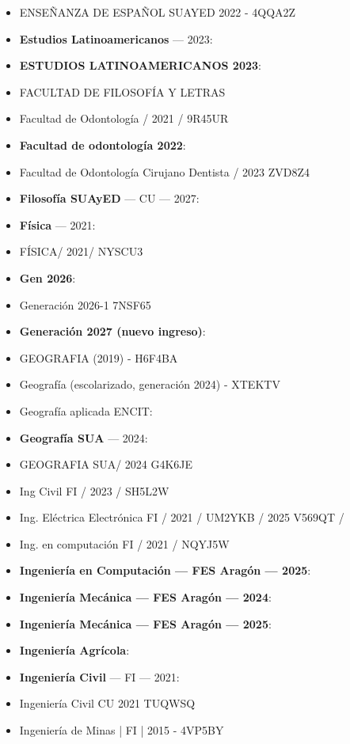 \begin{itemize}[leftmargin=*]
  \item ENSEÑANZA DE ESPAÑOL SUAYED 2022 - 4QQA2Z
  \item \textbf{Estudios Latinoamericanos} --- 2023: 
  \item \textbf{ESTUDIOS LATINOAMERICANOS 2023}: 
  \item FACULTAD DE FILOSOFÍA Y LETRAS
  \item Facultad de Odontología / 2021 / 9R45UR
  \item \textbf{Facultad de odontología 2022}: 
  \item Facultad de Odontología Cirujano Dentista / 2023 ZVD8Z4
  \item \textbf{Filosofía SUAyED} --- CU --- 2027: 
  \item \textbf{Física} --- 2021: 
  \item FÍSICA/ 2021/ NYSCU3
  \item \textbf{Gen 2026}: 
  \item Generación 2026-1 7NSF65
  \item \textbf{Generación 2027 (nuevo ingreso)}: 
  \item GEOGRAFIA (2019) - H6F4BA
  \item Geografía (escolarizado, generación 2024) - XTEKTV
  \item Geografía aplicada ENCIT:
  \item \textbf{Geografía SUA} --- 2024: 
  \item GEOGRAFIA SUA/ 2024 G4K6JE
  \item Ing Civil FI / 2023 / SH5L2W
  \item Ing. Eléctrica Electrónica FI / 2021 / UM2YKB / 2025 V569QT /
  \item Ing. en computación FI / 2021 / NQYJ5W
  \item \textbf{Ingenierí­a en Computación --- FES Aragón --- 2025}: 
  \item \textbf{Ingenierí­a Mecánica --- FES Aragón --- 2024}: 
  \item \textbf{Ingenierí­a Mecánica --- FES Aragón --- 2025}: 
  \item \textbf{Ingeniería Agrícola}: 
  \item \textbf{Ingeniería Civil} --- FI --- 2021: 
  \item Ingeniería Civil CU 2021 TUQWSQ
  \item Ingeniería de Minas | FI | 2015 - 4VP5BY

\end{itemize}
